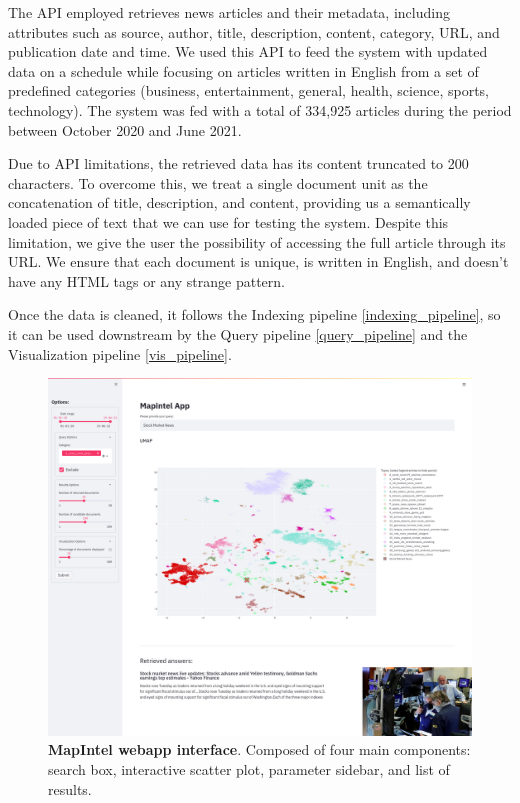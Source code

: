 \documentclass[a4paper]{article}
\begin{document}
The API employed retrieves news articles and their metadata, including attributes such as source, author, title, description, content, category, URL, and publication date and time. We used this API to feed the system with updated data on a schedule while focusing on articles written in English from a set of predefined categories (business, entertainment, general, health, science, sports, technology). The system was fed with a total of 334,925 articles during the period between October 2020 and June 2021.

Due to API limitations, the retrieved data has its content truncated to 200 characters. To overcome this, we treat a single document unit as the concatenation of title, description, and content, providing us a semantically loaded piece of text that we can use for testing the system. Despite this limitation, we give the user the possibility of accessing the full article through its URL. We ensure that each document is unique, is written in English, and doesn't have any HTML tags or any strange pattern.

Once the data is cleaned, it follows the Indexing pipeline \ref{indexing_pipeline}, so it can be used downstream by the Query pipeline \ref{query_pipeline} and the Visualization pipeline \ref{vis_pipeline}.

\begin{figure}[H]
	\centering
	\includegraphics[width=0.8\linewidth]{./assets/ui_screenshot}
	\caption{\textbf{MapIntel webapp interface}. Composed of four main components: search box, interactive scatter plot, parameter sidebar, and list of results.}
	\label{app_ui}
\end{figure}
\end{document}
